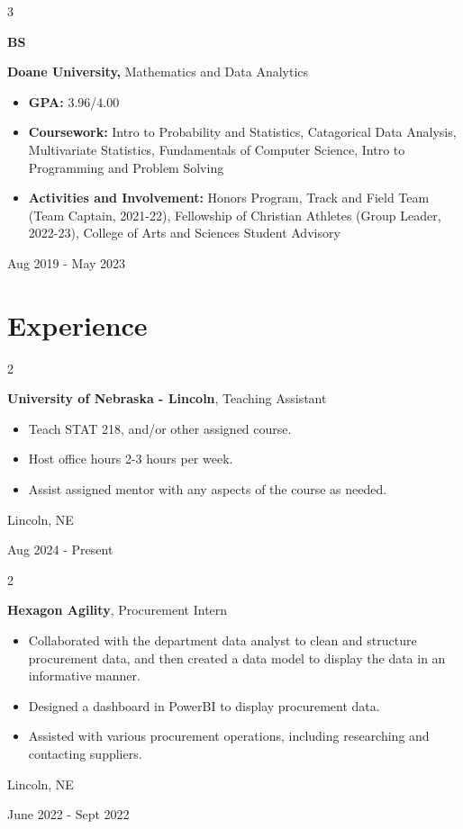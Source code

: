 \documentclass[10pt, letterpaper]{article}
\newenvironment{highlights}{
    \begin{itemize}[
        topsep=0.10 cm,
        parsep=0.10 cm,
        partopsep=0pt,
        itemsep=0pt,
        leftmargin=0.4 cm + 10pt
    ]
}{
    \end{itemize}
} %
\newenvironment{twocolentry}[2][]{
    \onecolentry
    \def\secondColumn{#2}
    \setcolumnwidth{\fill, 4.5 cm}
    \begin{paracol}{2}
}{
    \switchcolumn \raggedleft \secondColumn
    \end{paracol}
    \endonecolentry
} %
\newenvironment{threecolentry}[3][]{
    \onecolentry
    \def\thirdColumn{#3}
    \setcolumnwidth{1 cm, \fill, 4.5 cm}
    \begin{paracol}{3}
    {\raggedright #2} \switchcolumn
}{
    \switchcolumn \raggedleft \thirdColumn
    \end{paracol}
    \endonecolentry
} %
\begin{document}
        \vspace{0.2 cm}

                \begin{threecolentry}{\textbf{BS}}{
            Aug 2019 - May 2023
        }
            \textbf{Doane University, }Mathematics and Data Analytics
            \begin{highlights}
                \item \textbf{GPA:} 3.96/4.00
                \item \textbf{Coursework:} Intro to Probability and Statistics, Catagorical Data Analysis, Multivariate Statistics, Fundamentals of Computer Science, Intro to Programming and Problem Solving
                \item \textbf{Activities and Involvement:} Honors Program, Track and Field Team (Team Captain, 2021-22), Fellowship of Christian Athletes (Group Leader, 2022-23), College of Arts and Sciences Student Advisory
            \end{highlights}
        \end{threecolentry}


    
    \section{Experience}

        \begin{twocolentry}{
            Lincoln, NE

        Aug 2024 - Present
        }
            \textbf{University of Nebraska - Lincoln}, Teaching Assistant
            \begin{highlights}
                \item Teach STAT 218, and/or other assigned course.
                \item Host office hours 2-3 hours per week.
                \item Assist assigned mentor with any aspects of the course as needed.
            \end{highlights}
        \end{twocolentry}
        
        \vspace{0.2 cm}

        
        \begin{twocolentry}{
            Lincoln, NE

        June 2022 - Sept 2022
        }
            \textbf{Hexagon Agility}, Procurement Intern
            \begin{highlights}
                \item Collaborated with the department data analyst to clean and structure procurement data, and then created a data model to display the data in an informative manner.
                \item Designed a dashboard in PowerBI to display procurement data.
                \item Assisted with various procurement operations, including researching and contacting suppliers.
            \end{highlights}
        \end{twocolentry}
\end{document}
